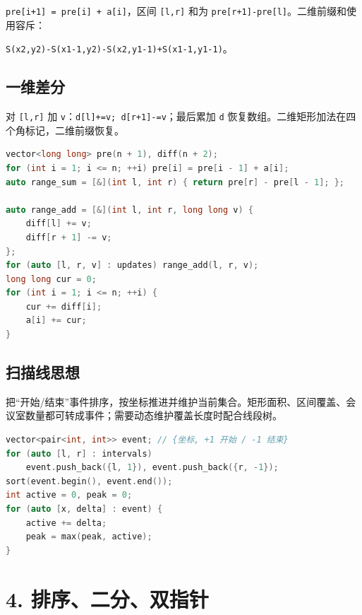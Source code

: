 \passthrough{\lstinline!pre[i+1] = pre[i] + a[i]!}，区间 \passthrough{\lstinline![l,r]!} 和为 \passthrough{\lstinline!pre[r+1]-pre[l]!}。二维前缀和使用容斥：

\passthrough{\lstinline!S(x2,y2)-S(x1-1,y2)-S(x2,y1-1)+S(x1-1,y1-1)!}。

\subsection{一维差分}\label{ux4e00ux7ef4ux5deeux5206}

对 \passthrough{\lstinline![l,r]!} 加 \passthrough{\lstinline!v!}：\passthrough{\lstinline!d[l]+=v; d[r+1]-=v!}；最后累加 \passthrough{\lstinline!d!} 恢复数组。二维矩形加法在四个角标记，二维前缀恢复。

\begin{lstlisting}[language={C++}]
vector<long long> pre(n + 1), diff(n + 2);
for (int i = 1; i <= n; ++i) pre[i] = pre[i - 1] + a[i];
auto range_sum = [&](int l, int r) { return pre[r] - pre[l - 1]; };

auto range_add = [&](int l, int r, long long v) {
    diff[l] += v;
    diff[r + 1] -= v;
};
for (auto [l, r, v] : updates) range_add(l, r, v);
long long cur = 0;
for (int i = 1; i <= n; ++i) {
    cur += diff[i];
    a[i] += cur;
}
\end{lstlisting}

\subsection{扫描线思想}\label{ux626bux63cfux7ebfux601dux60f3}

把``开始/结束''事件排序，按坐标推进并维护当前集合。矩形面积、区间覆盖、会议室数量都可转成事件；需要动态维护覆盖长度时配合线段树。

\begin{lstlisting}[language={C++}]
vector<pair<int, int>> event; // {坐标, +1 开始 / -1 结束}
for (auto [l, r] : intervals)
    event.push_back({l, 1}), event.push_back({r, -1});
sort(event.begin(), event.end());
int active = 0, peak = 0;
for (auto [x, delta] : event) {
    active += delta;
    peak = max(peak, active);
}
\end{lstlisting}

\section{4. 排序、二分、双指针}\label{ux6392ux5e8fux4e8cux5206ux53ccux6307ux9488}

